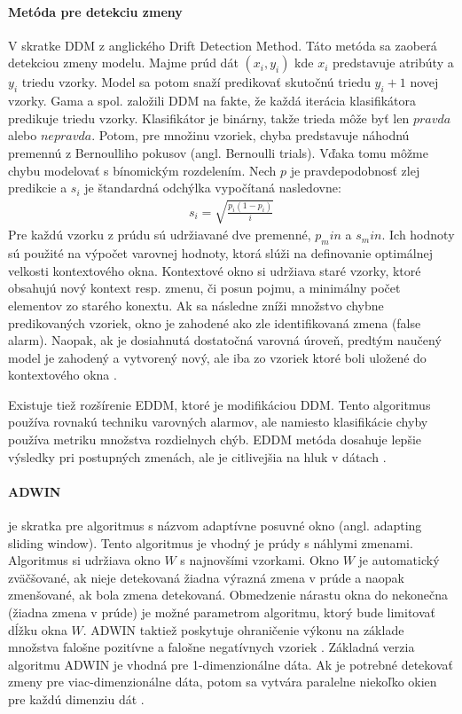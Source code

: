 \paragraph{Metóda pre detekciu zmeny} V skratke DDM z anglického Drift Detection Method. Táto metóda sa zaoberá detekciou zmeny modelu. Majme prúd dát $(x_i,y_i)$ kde $x_i$ predstavuje atribúty a $y_i$ triedu vzorky. Model sa potom snaží predikovať skutočnú triedu $y_i+1$ novej vzorky. Gama a spol. založili DDM na fakte, že každá iterácia klasifikátora predikuje triedu vzorky. Klasifikátor je binárny, takže trieda môže byť len $pravda$ alebo $nepravda$. Potom, pre množinu vzoriek, chyba predstavuje náhodnú premennú z Bernoulliho pokusov (angl. Bernoulli trials). Vďaka tomu môžme chybu modelovať s bínomickým rozdelením. Nech $p$ je pravdepodobnosť zlej predikcie a $s_i$ je štandardná odchýlka vypočítaná nasledovne:
\begin{align*}
s_i = \sqrt{ \frac{p_i(1-p_i)} {i} }
\end{align*}
Pre každú vzorku z prúdu sú udržiavané dve premenné, $p_min$ a $s_min$. Ich hodnoty sú použité na výpočet varovnej hodnoty, ktorá slúži na definovanie optimálnej velkosti kontextového okna. Kontextové okno si udržiava staré vzorky, ktoré obsahujú nový kontext resp. zmenu, či posun pojmu, a minimálny počet elementov zo starého konextu. Ak sa následne zníži množstvo chybne predikovaných vzoriek, okno je zahodené ako zle identifikovaná zmena (false alarm). Naopak, ak je dosiahnutá dostatočná varovná úroveň, predtým naučený model je zahodený a vytvorený nový, ale iba zo vzoriek ktoré boli uložené do kontextového okna \citep{gama2004learning, brzezinski2010mining}.
\par
Existuje tiež rozšírenie EDDM, ktoré je modifikáciou DDM. Tento algoritmus používa rovnakú techniku varovných alarmov, ale namiesto klasifikácie chyby používa metriku množstva rozdielnych chýb. EDDM metóda dosahuje lepšie výsledky pri postupných zmenách, ale je citlivejšia na hluk v dátach \citep{wadewale2015survey}.

\paragraph{ADWIN} je skratka pre algoritmus s názvom adaptívne posuvné okno (angl. adapting sliding window). Tento algoritmus je vhodný je prúdy s náhlymi zmenami. Algoritmus si udržiava okno $W$ s najnovšími vzorkami. Okno $W$ je automatický zväčšované, ak nieje detekovaná žiadna výrazná zmena v prúde a naopak zmenšované, ak bola zmena detekovaná. Obmedzenie nárastu okna do nekonečna (žiadna zmena v prúde) je možné parametrom algoritmu, ktorý bude limitovať dĺžku okna $W$. ADWIN taktiež poskytuje ohraničenie výkonu na základe množstva falošne pozitívne a falošne negatívnych vzoriek \citep{wadewale2015survey}. Základná verzia algoritmu ADWIN je vhodná pre 1-dimenzionálne dáta. Ak je potrebné detekovať zmeny pre viac-dimenzionálne dáta, potom sa vytvára paralelne niekoľko okien pre každú dimenziu dát \citep{brzezinski2010mining}.

